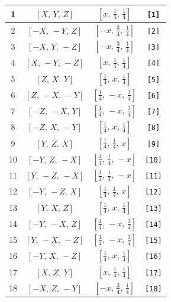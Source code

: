 \documentclass[fleqn,8pt]{jsarticle}
\begin{document}
\begin{longtable}{cccc}
1 & $\left[ X,\, Y,\, Z \right]$ & $\left[ x,\, \frac{1}{4},\, \frac{1}{4} \right]$ & {\tt [1]} \\ \hline
2 & $\left[ - X,\, - Y,\, Z \right]$ & $\left[ - x,\, \frac{3}{4},\, \frac{1}{4} \right]$ & {\tt [2]} \\ \hline
3 & $\left[ - X,\, Y,\, - Z \right]$ & $\left[ - x,\, \frac{3}{4},\, \frac{1}{4} \right]$ & {\tt [3]} \\ \hline
4 & $\left[ X,\, - Y,\, - Z \right]$ & $\left[ x,\, \frac{1}{4},\, \frac{1}{4} \right]$ & {\tt [4]} \\ \hline
5 & $\left[ Z,\, X,\, Y \right]$ & $\left[ \frac{1}{4},\, x,\, \frac{1}{4} \right]$ & {\tt [5]} \\ \hline
6 & $\left[ Z,\, - X,\, - Y \right]$ & $\left[ \frac{1}{4},\, - x,\, \frac{3}{4} \right]$ & {\tt [6]} \\ \hline
7 & $\left[ - Z,\, - X,\, Y \right]$ & $\left[ \frac{1}{4},\, - x,\, \frac{3}{4} \right]$ & {\tt [7]} \\ \hline
8 & $\left[ - Z,\, X,\, - Y \right]$ & $\left[ \frac{1}{4},\, x,\, \frac{1}{4} \right]$ & {\tt [8]} \\ \hline
9 & $\left[ Y,\, Z,\, X \right]$ & $\left[ \frac{1}{4},\, \frac{1}{4},\, x \right]$ & {\tt [9]} \\ \hline
10 & $\left[ - Y,\, Z,\, - X \right]$ & $\left[ \frac{3}{4},\, \frac{1}{4},\, - x \right]$ & {\tt [10]} \\ \hline
11 & $\left[ Y,\, - Z,\, - X \right]$ & $\left[ \frac{3}{4},\, \frac{1}{4},\, - x \right]$ & {\tt [11]} \\ \hline
12 & $\left[ - Y,\, - Z,\, X \right]$ & $\left[ \frac{1}{4},\, \frac{1}{4},\, x \right]$ & {\tt [12]} \\ \hline
13 & $\left[ Y,\, X,\, Z \right]$ & $\left[ \frac{1}{4},\, x,\, \frac{1}{4} \right]$ & {\tt [13]} \\ \hline
14 & $\left[ - Y,\, - X,\, Z \right]$ & $\left[ \frac{1}{4},\, - x,\, \frac{3}{4} \right]$ & {\tt [14]} \\ \hline
15 & $\left[ Y,\, - X,\, - Z \right]$ & $\left[ \frac{1}{4},\, - x,\, \frac{3}{4} \right]$ & {\tt [15]} \\ \hline
16 & $\left[ - Y,\, X,\, - Z \right]$ & $\left[ \frac{1}{4},\, x,\, \frac{1}{4} \right]$ & {\tt [16]} \\ \hline
17 & $\left[ X,\, Z,\, Y \right]$ & $\left[ x,\, \frac{1}{4},\, \frac{1}{4} \right]$ & {\tt [17]} \\ \hline
18 & $\left[ - X,\, Z,\, - Y \right]$ & $\left[ - x,\, \frac{3}{4},\, \frac{1}{4} \right]$ & {\tt [18]} \\ \hline

\end{longtable}
\end{document}
